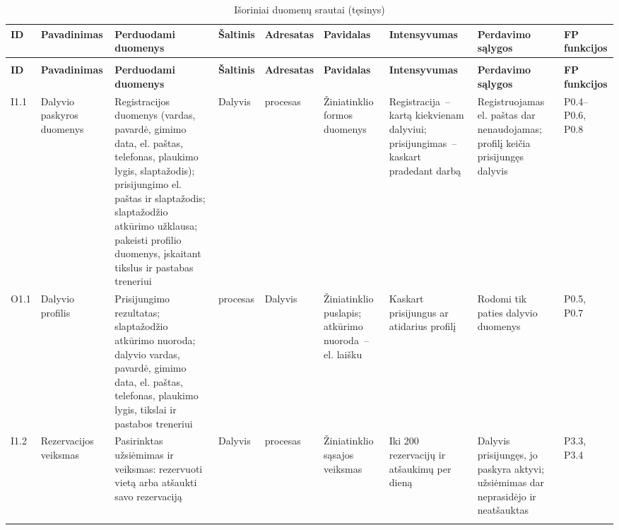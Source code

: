 \begin{landscape}
\begingroup
\footnotesize
\setlength{\tabcolsep}{3pt}
\begin{longtable}{@{}>{\raggedright\arraybackslash}p{0.9cm}>{\raggedright\arraybackslash}p{2.3cm}>{\raggedright\arraybackslash}p{4.4cm}>{\raggedright\arraybackslash}p{2.2cm}>{\raggedright\arraybackslash}p{2.2cm}>{\raggedright\arraybackslash}p{2.5cm}>{\raggedright\arraybackslash}p{3.0cm}>{\raggedright\arraybackslash}p{3.3cm}>{\raggedright\arraybackslash}p{1.7cm}@{}}
\caption{Išoriniai duomenų srautai}\label{tab:dfd-io}\\
\toprule
\textbf{ID} & \textbf{Pavadinimas} & \textbf{Perduodami duomenys} & \textbf{Šaltinis} & \textbf{Adresatas} & \textbf{Pavidalas} & \textbf{Intensyvumas} & \textbf{Perdavimo sąlygos} & \textbf{FP funkcijos} \\
\midrule
\endfirsthead
\caption[]{Išoriniai duomenų srautai (tęsinys)}\\
\toprule
\textbf{ID} & \textbf{Pavadinimas} & \textbf{Perduodami duomenys} & \textbf{Šaltinis} & \textbf{Adresatas} & \textbf{Pavidalas} & \textbf{Intensyvumas} & \textbf{Perdavimo sąlygos} & \textbf{FP funkcijos} \\
\midrule
\endhead
I1.1 & Dalyvio paskyros duomenys & Registracijos duomenys (vardas, pavardė, gimimo data, el. paštas, telefonas, plaukimo lygis, slaptažodis); prisijungimo el. paštas ir slaptažodis; slaptažodžio atkūrimo užklausa; pakeisti profilio duomenys, įskaitant tikslus ir pastabas treneriui & Dalyvis & 1 procesas & Žiniatinklio formos duomenys & Registracija~– kartą kiekvienam dalyviui; prisijungimas~– kaskart pradedant darbą & Registruojamas el. paštas dar nenaudojamas; profilį keičia prisijungęs dalyvis & P0.4–P0.6, P0.8 \\ \addlinespace[3pt]
O1.1 & Dalyvio profilis & Prisijungimo rezultatas; slaptažodžio atkūrimo nuoroda; dalyvio vardas, pavardė, gimimo data, el. paštas, telefonas, plaukimo lygis, tikslai ir pastabos treneriui & 1 procesas & Dalyvis & Žiniatinklio puslapis; atkūrimo nuoroda~– el. laišku & Kaskart prisijungus ar atidarius profilį & Rodomi tik paties dalyvio duomenys & P0.5, P0.7 \\ \addlinespace[3pt]
I1.2 & Rezervacijos veiksmas & Pasirinktas užsiėmimas ir veiksmas: rezervuoti vietą arba atšaukti savo rezervaciją & Dalyvis & 4 procesas & Žiniatinklio sąsajos veiksmas & Iki 200 rezervacijų ir atšaukimų per dieną & Dalyvis prisijungęs, jo paskyra aktyvi; užsiėmimas dar neprasidėjo ir neatšauktas & P3.3, P3.4 \\ \addlinespace[3pt]

\end{longtable}
\end{landscape}
